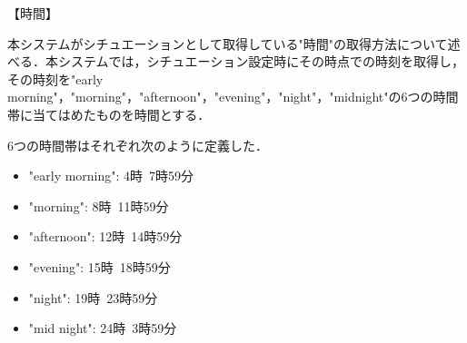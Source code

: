 【時間】
\par 本システムがシチュエーションとして取得している"時間"の取得方法について述べる．本システムでは，シチュエーション設定時にその時点での時刻を取得し，その時刻を"early morning"，"morning"，"afternoon"，"evening"，"night"，"midnight"の6つの時間帯に当てはめたものを時間とする．
\par 6つの時間帯はそれぞれ次のように定義した．
\begin{itemize}
 \item "early morning": 4時~7時59分
 \item "morning": 8時~11時59分
 \item "afternoon": 12時~14時59分
 \item "evening": 15時~18時59分
 \item "night": 19時~23時59分
 \item "mid night": 24時~3時59分
\end{itemize}
